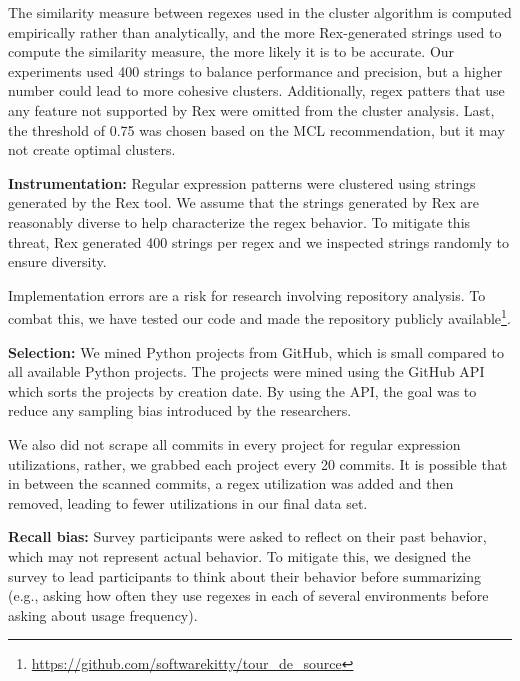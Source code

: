\documentclass{sig-alternate-05-2015}
\newcommand{\todoNow}[1]{\textbf{\textcolor{red}{TODO.NOW: #1}}} %
\newcommand{\todoMid}[1]{\textbf{\textcolor{magenta}{TODO.MID: #1}}} %
\begin{document}
The similarity measure between regexes used in the cluster algorithm is computed empirically rather than analytically, and the more Rex-generated strings used to compute the similarity measure, the more likely it is to be accurate. Our experiments used 400 strings to balance performance and precision, but a higher number could lead to more cohesive clusters. Additionally, regex patters that use any feature not supported by Rex were omitted from the cluster analysis. Last, the threshold of 0.75 was chosen based on the MCL recommendation, but it may not create optimal clusters. %


\textbf{Instrumentation:} Regular expression patterns were clustered using strings generated by the Rex tool.  We assume that the strings generated by Rex are reasonably diverse to help characterize the regex behavior. To mitigate this threat, Rex generated 400 strings per regex and we inspected strings randomly to ensure diversity.

Implementation errors are a risk for research involving repository analysis. To combat this, we have tested our code and made the repository publicly available\footnote{\url{https://github.com/softwarekitty/tour_de_source}}.

\textbf{Selection:} We mined  Python projects from GitHub, which is  small compared to all available Python projects. The projects were mined using the GitHub API which sorts the projects by creation date. By using the API, the goal was to reduce any sampling bias introduced by the researchers.

We also did not scrape all commits in every project for regular expression utilizations, rather, we grabbed each project every 20 commits. It is possible that in between the scanned commits, a regex utilization was added and then removed, leading to fewer utilizations in our final data set.

\textbf{Recall bias:} Survey participants were asked to reflect on their past behavior, which may not  represent actual behavior. To mitigate this, we designed the survey to lead participants to think about their behavior before summarizing (e.g., asking how often they use regexes in each of several environments before asking about usage frequency).
\end{document}
